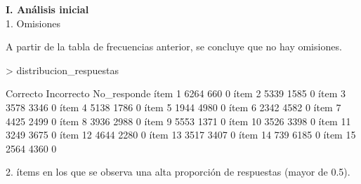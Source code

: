 \documentclass{article}
\begin{document}

\textbf{I. Análisis inicial}\\ 
1. Omisiones


A partir de la tabla de frecuencias anterior, se concluye que no hay omisiones. 

\begin{Schunk}
\begin{Sinput}
> distribucion_respuestas
\end{Sinput}
\begin{Soutput}
        Correcto Incorrecto No_responde
ítem 1      6264        660           0
ítem 2      5339       1585           0
ítem 3      3578       3346           0
ítem 4      5138       1786           0
ítem 5      1944       4980           0
ítem 6      2342       4582           0
ítem 7      4425       2499           0
ítem 8      3936       2988           0
ítem 9      5553       1371           0
ítem 10     3526       3398           0
ítem 11     3249       3675           0
ítem 12     4644       2280           0
ítem 13     3517       3407           0
ítem 14      739       6185           0
ítem 15     2564       4360           0
\end{Soutput}
\end{Schunk}

2.	ítems en los que se observa una alta proporción de respuestas (mayor de 0.5). 
\end{document}
